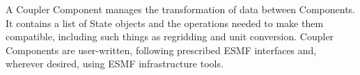 %


A Coupler Component manages the transformation of data between Components.
It contains a list of State objects and the operations needed to
make them compatible, including such things as regridding and unit conversion.
Coupler Components are user-written, following prescribed ESMF interfaces
and, wherever desired, using ESMF infrastructure tools.
